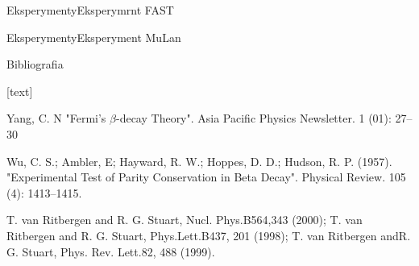 \documentclass[xcolor={dvipsnames}]{beamer}
\begin{document}
\begin{frame}{Eksperymenty}{Eksperymrnt FAST}

\end{frame}

\begin{frame}{Eksperymenty}{Eksperyment MuLan}

\end{frame}


\begin{frame}{Bibliografia}

    \begin{thebibliography}{9}
        [text]

         Yang, C. N  "Fermi's $\beta$-decay Theory". Asia Pacific Physics Newsletter. 1 (01): 27–30

          Wu, C. S.; Ambler, E; Hayward, R. W.; Hoppes, D. D.; Hudson, R. P. (1957). "Experimental Test of Parity Conservation in Beta Decay". Physical Review. 105 (4): 1413–1415.

         T. van Ritbergen and R. G. Stuart, Nucl. Phys.B564,343 (2000); T. van Ritbergen and R. G. Stuart, Phys.Lett.B437,  201  (1998);   T. van  Ritbergen  andR. G. Stuart, Phys. Rev. Lett.82, 488 (1999).

    \end{thebibliography}

\end{frame}
\end{document}
